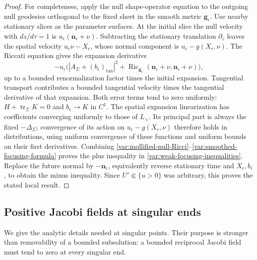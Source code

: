 \begin{proof}
For completeness, apply the null shape-operator equation to the
outgoing null geodesics orthogonal to the fixed sheet in the smooth
metric $\mathbf g_\epsilon$.  Use nearby stationary slices as the
parameter surfaces.  At the initial slice the null velocity with
$dz/d\tau=1$ is $u_\epsilon(\mathbf n_\epsilon+\nu)$.
Subtracting the stationary translation $\partial_z$ leaves the
spatial velocity $u_\epsilon\nu-X_\epsilon$, whose normal component
is $u_\epsilon-g(X_\epsilon,\nu)$.  The Riccati equation gives the
expansion derivative
\begin{equation}\label{var:smoothed-focusing-formula}
 -u_\epsilon\bigl(
     |A_\Sigma+(b_\epsilon)_{\mathrm{tan}}|^2+
     \operatorname{Ric}_{\mathbf g_\epsilon}
        (\mathbf n_\epsilon+\nu,\mathbf n_\epsilon+\nu)\bigr),
\end{equation}
up to a bounded renormalization factor times the initial expansion.
Tangential transport contributes a bounded tangential velocity times
the tangential derivative of that expansion.  Both error terms tend
to zero uniformly: $H+\operatorname{tr}_\Sigma K=0$ and
$b_\epsilon\to K$ in $C^1$.
The spatial expansion linearization has coefficients converging
uniformly to those of $L_+$.  Its principal part is always the fixed
$-\Delta_\Sigma$; convergence of its action on
$u_\epsilon-g(X_\epsilon,\nu)$ therefore holds in distributions,
using uniform convergence of these functions and uniform bounds on
their first derivatives.  Combining
\eqref{var:mollified-null-Ricci}--\eqref{var:smoothed-focusing-formula}
proves the plus inequality in
\eqref{var:weak-focusing-inequalities}.  Replace the future normal by
$-\mathbf n_\epsilon$, equivalently reverse stationary time and
$X_\epsilon,b_\epsilon$, to obtain the minus inequality.  Since
$U'\Subset\{u>0\}$ was arbitrary, this proves the stated local result.
\end{proof}

\subsection{Positive Jacobi fields at singular ends}

We give the analytic details needed at singular points.  Their purpose
is stronger than removability of a bounded subsolution: a bounded
reciprocal Jacobi field must tend to zero at every singular end.

